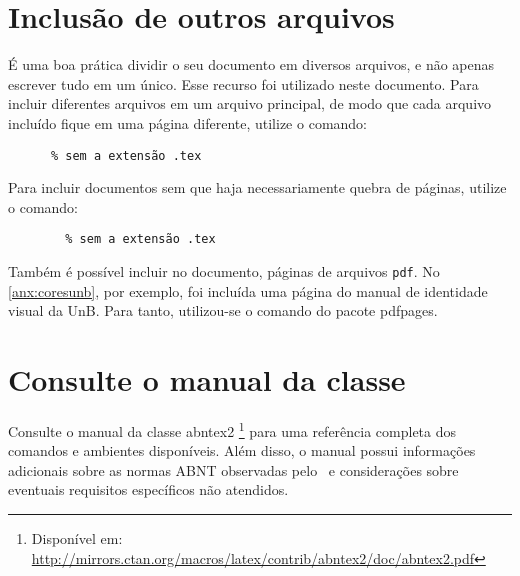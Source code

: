 \section{Inclusão de outros arquivos}\label{sec:include}

É uma boa prática dividir o seu documento em diversos arquivos, e não apenas escrever tudo em um único. Esse recurso foi utilizado neste documento. Para incluir diferentes arquivos em um arquivo principal, de modo que cada arquivo incluído fique em uma página diferente, utilize o comando:
\begin{verbatim}
      % sem a extensão .tex
\end{verbatim}

Para incluir documentos sem que haja necessariamente quebra de páginas, utilize o comando:
\begin{verbatim}
        % sem a extensão .tex
\end{verbatim}

Também é possível incluir no documento, páginas de arquivos \texttt{pdf}. No \cref{anx:coresunb}, por exemplo, foi incluída uma página do manual de identidade visual da UnB. Para tanto, utilizou-se o comando \verb|| do pacote \textsf{pdfpages}.

\section{Consulte o manual da classe \abnTeX}

Consulte o manual da classe \textsf{abntex2} \cite{abntex2classe}\footnote{Disponível em: \url{http://mirrors.ctan.org/macros/latex/contrib/abntex2/doc/abntex2.pdf}} para uma referência completa dos comandos e ambientes disponíveis. Além disso, o manual possui informações adicionais sobre as normas ABNT observadas pelo \abnTeX\ e considerações sobre eventuais requisitos específicos não atendidos.